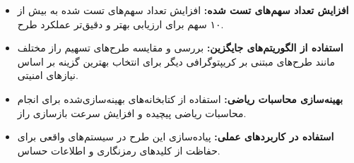 \documentclass{report}
\begin{document}
 \begin{itemize}
	     \item \textbf{افزایش تعداد سهم‌های تست شده:} افزایش تعداد سهم‌های تست شده به بیش از ۱۰ سهم برای ارزیابی بهتر و دقیق‌تر عملکرد طرح.
	
	     \item \textbf{استفاده از الگوریتم‌های جایگزین:} بررسی و مقایسه طرح‌های تسهیم راز مختلف مانند طرح‌های مبتنی بر کریپتوگرافی دیگر برای انتخاب بهترین گزینه بر اساس نیازهای امنیتی.
	
	     \item \textbf{بهینه‌سازی محاسبات ریاضی:} استفاده از کتابخانه‌های بهینه‌سازی‌شده برای انجام محاسبات ریاضی پیچیده و افزایش سرعت بازسازی راز.
	
	     \item \textbf{استفاده در کاربردهای عملی:} پیاده‌سازی این طرح در سیستم‌های واقعی برای حفاظت از کلیدهای رمزنگاری و اطلاعات حساس.
	 \end{itemize}
\end{document}
